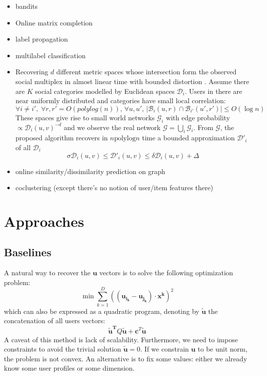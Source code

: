 \begin{itemize}
	\item bandits \autocites{ClusterBandit14}{Li2015}
	\item Online matrix completion \autocite{OnlineMatrix15}
	\item label propagation \autocite{LabelPropa03}
	\item multilabel classification \autocite{Madjarov2012}
	\item Recovering $d$ different metric spaces whose intersection form the
		observed social multiplex in almost linear time with bounded distortion
		\autocite{Abraham2012a}. Assume there are $K$ social categories
		modelled by Euclidean spaces $\mathcal{D}_i$. Users in there are near
		uniformly distributed and categories have small local correlation: \[
			\forall i\neq i', \; \forall r, r' = O(polylog(n)),\, \forall u,
			u',\, |\mathcal{B}_i(u, r) \cap \mathcal{B}_{i'}(u', r')| \leq O(\log n) \]
		These spaces give rise to small world networks $\mathcal{G}_i$ with
		edge probability $\propto \mathcal{D}_i(u, v)^{-d}$ and we observe the
		real network $\mathcal{G} =\bigcup_i \mathcal{G}_i$. From
		$\mathcal{G}$, the proposed algorithm recovers in $n \mathrm{polylog} n$ time
		a bounded approximation $\mathcal{D}'_i$ of all $\mathcal{D}_i$ \[
			\sigma \mathcal{D}_i(u, v) \leq \mathcal{D}'_i(u, v) \leq \delta
			\mathcal{D}_i(u, v) + \Delta \]
	\item online similarity/dissimilarity prediction on graph \autocite{Gentile2013}
	\item coclustering \autocite{Dhillon2001} (except there's no notion of
		user/item features there)
\end{itemize}

\section{Approaches}

\subsection{Baselines}
A natural way to recover the $\bm{u}$ vectors is to solve the following
optimization problem:
\begin{equation}
	\min \sum_{k=1}^D \left( (\bm{u_{i_k}} - \bm{u_{j_k}} ) \cdot \bm{x^k} \right )^2
	\label{eq:optim}
\end{equation}
which can also be expressed as a quadratic program, denoting by $\bm{\tilde{u}}$ the
concatenation of all users vectors:
\begin{equation*}
	\bm{\tilde{u}^T} Q \bm{\tilde{u}} + \bm{c}^T \bm{\tilde{u}}
\end{equation*}
A caveat of this method is lack of scalability. Furthermore, we need to impose
constraints to avoid the trivial solution $\bm{\tilde{u}} = 0$. If we constrain
$\bm{u}$ to be unit norm, the problem is not convex. An alternative is to fix
some values: either we already know some user profiles or some dimension.

